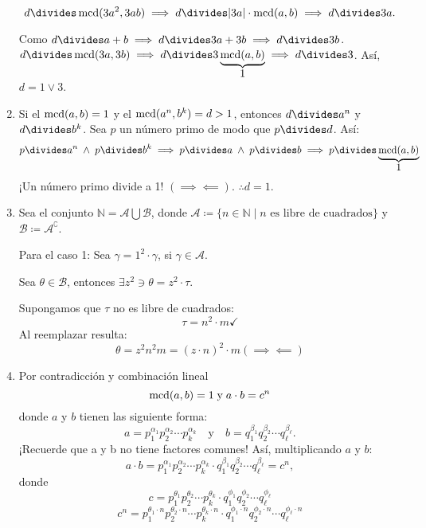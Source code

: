 \begin{enumerate}[font={\bfseries},label={\arabic*.}]
	\[d\divides\mcd(3a^{2},3ab)\implies d\divides|3a|\cdot\mcd(a,b)\implies d\divides 3a.\]
	
	Como $d\divides a+b\implies d\divides 3a+3b\implies d\divides 3b$. %
	$d\divides\mcd(3a,3b)\implies d\divides 3\underbrace{\mcd(a,b)}_{\displaystyle1}\implies d\divides 3$. Así, $d=1\vee3$.
	
	\item Si el $\operatorname{mcd}(a,b)=1$ y el $\operatorname{mcd}(a^{n},b^{k})=d>1$, entonces $d\divides a^{n}$ y $d\divides b^{k}$. Sea $p$ un número primo de modo que $p\divides d$. Así:
	\begin{align*}
	p\divides a^{n}\;\wedge\;p\divides b^{k}\implies p\divides a\;\wedge\; p\divides b\implies p\divides\underbrace{\mcd(a,b)}_{\displaystyle1}
	\end{align*}
	¡Un número primo divide a 1! $(\implies\impliedby)$. $\therefore d=1$.
	
	\item Sea el conjunto $\mathbb{N}=\mathcal{A}\bigcup\mathcal{B}$, donde $\mathcal{A}\coloneq\{n\in\mathbb{N}\mid n\text{ es libre de cuadrados} \}$ y $\mathcal{B}\coloneq\mathcal{A}^{\complement}$.
	
	Para el caso 1: Sea $\gamma=1^{2}\cdot\gamma$, si $\gamma\in\mathcal{A}$.
	
	Sea $\theta\in\mathcal{B}$, entonces $\exists z^{2}\ni\theta=z^{2}\cdot\tau$.
	
	Supongamos que $\tau$ no es libre de cuadrados:
	\[\tau=n^{2}\cdot m \checkmark\]
	Al reemplazar resulta:
	\[\theta=z^{2}n^{2}m=(z\cdot n)^{2}\cdot m(\implies\impliedby)\]
	
	\item Por contradicción y combinación lineal
	\[\operatorname{mcd}(a,b)=1\;\text{y}\;a\cdot b=c^{n}\]
	donde $a$ y $b$ tienen las siguiente forma:
	\[a={p}^{\alpha_1}_{1}{p}^{\alpha_2}_{2}\cdots{p}^{\alpha_k}_{k}\quad\text{y}\quad b={q}^{\beta_1}_{1}{q}^{\beta_2}_{2}\cdots{q}^{\beta_\ell}_{\ell}.\]
	¡Recuerde que a y b no tiene factores comunes!
	Así, multiplicando $a$ y $b$:
	\[
	a\cdot b={p}^{\alpha_1}_{1}{p}^{\alpha_2}_{2}\cdots{p}^{\alpha_k}_{k}\cdot{q}^{\beta_1}_{1}{q}^{\beta_2}_{2}\cdots{q}^{\beta_\ell}_{\ell}=c^{n},
	\]
	donde
	\[c={p}^{\theta_1}_{1}{p}^{\theta_2}_{2}\cdots{p}^{\theta_k}_{k}\cdot{q}^{\phi_1}_{1}{q}^{\phi_2}_{2}\cdots{q}^{\phi_\ell}_{\ell}\]
	\[c^{n}={p}^{\theta_1\cdot n}_{1}{p}^{\theta_2\cdot n}_{2}\cdots{p}^{\theta_k\cdot n}_{k}\cdot{q}^{\phi_1\cdot n}_{1}{q}^{\phi_2\cdot n}_{2}\cdots{q}^{\phi_\ell\cdot n}_{\ell}\]
	

\end{enumerate}
